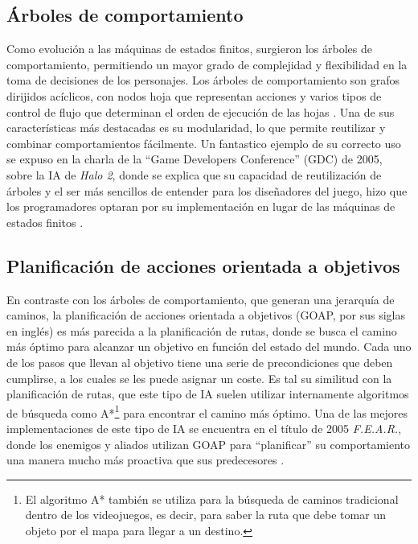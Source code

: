 \subsection{Árboles de comportamiento}

Como evolución a las máquinas de estados finitos, surgieron los árboles de comportamiento, permitiendo un mayor grado de complejidad y flexibilidad en la toma de decisiones de los personajes. Los árboles de comportamiento son grafos dirijidos acíclicos, con nodos hoja que representan acciones y varios tipos de control de flujo que determinan el orden de ejecución de las hojas \cite{epic_games_behavior_2025}. Una de sus características más destacadas es su modularidad, lo que permite reutilizar y combinar comportamientos fácilmente. Un fantastico ejemplo de su correcto uso se expuso en la charla de la ``Game Developers Conference'' (GDC) de 2005, sobre la IA de \textit{Halo 2}, donde se explica que su capacidad de reutilización de árboles y el ser más sencillos de entender para los diseñadores del juego, hizo que los programadores optaran por su implementación en lugar de las máquinas de estados finitos \cite{isla_managing_2005}.


\subsection{Planificación de acciones orientada a objetivos}

En contraste con los árboles de comportamiento, que generan una jerarquía de caminos, la planificación de acciones orientada a objetivos (GOAP, por sus siglas en inglés) es más parecida a la planificación de rutas, donde se busca el camino más óptimo para alcanzar un objetivo en función del estado del mundo. Cada uno de los pasos que llevan al objetivo tiene una serie de precondiciones que deben cumplirse, a los cuales se les puede asignar un coste. Es tal su similitud con la planificación de rutas, que este tipo de IA suelen utilizar internamente algoritmos de búsqueda como A*\footnote{El algoritmo A* también se utiliza para la búsqueda de caminos tradicional dentro de los videojuegos, es decir, para saber la ruta que debe tomar un objeto por el mapa para llegar a un destino.} para encontrar el camino más óptimo. Una de las mejores implementaciones de este tipo de IA se encuentra en el título de 2005 \textit{F.E.A.R.}, donde los enemigos y aliados utilizan GOAP para ``planificar'' su comportamiento una manera mucho más proactiva que sus predecesores \cite{jeff_gdc_2006}.


